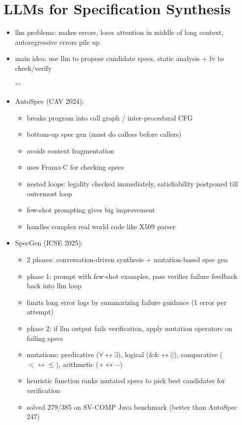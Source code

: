 \documentclass[11pt]{book}
\begin{document}
\setcounter{chapter}{4}
\chapter{LLMs for Specification Synthesis}

\begin{itemize}
\item llm problems: makes errors, loses attention in middle of long context, autoregressive errors pile up
\item main idea: use llm to propose candidate specs, static analysis + fv to check/verify

```
\item AutoSpec (CAV 2024):
\begin{itemize}
    \item breaks program into call graph / inter-procedural CFG
    \item bottom-up spec gen (must do callees before callers)
    \item avoids context fragmentation
    \item uses Frama-C for checking specs
    \item nested loops: legality checked immediately, satisfiability postponed till outermost loop
    \item few-shot prompting gives big improvement
    \item handles complex real world code like X509 parser
\end{itemize}

\item SpecGen (ICSE 2025):
\begin{itemize}
    \item 2 phases: conversation-driven synthesis + mutation-based spec gen
    \item phase 1: prompt with few-shot examples, pass verifier failure feedback back into llm loop
    \item limits long error logs by summarizing failure guidance (1 error per attempt)
    \item phase 2: if llm output fails verification, apply mutation operators on failing specs
    \item mutations: predicative ($\forall \leftrightarrow \exists$), logical ($\&\& \leftrightarrow \vert{}\vert{}$), comparative ($< \leftrightarrow \le$), arithmetic ($+ \leftrightarrow -$)
    \item heuristic function ranks mutated specs to pick best candidates for verification
    \item solved 279/385 on SV-COMP Java benchmark (better than AutoSpec 247)
\end{itemize}



\end{itemize}
\end{document}
